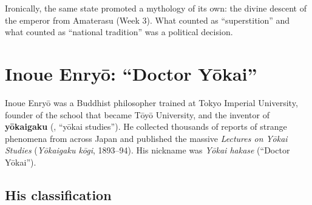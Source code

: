 \begin{remark}
Ironically, the same state promoted a mythology of its own: the divine descent of the
emperor from Amaterasu (Week 3). What counted as ``superstition'' and what counted as
``national tradition'' was a political decision.
\end{remark}

\section{Inoue Enryō: ``Doctor Yōkai''}

Inoue Enryō was a Buddhist philosopher trained at Tokyo Imperial University, founder of
the school that became Tōyō University, and the inventor of \textbf{yōkaigaku}
(, ``yōkai studies''). He collected thousands of reports of strange phenomena
from across Japan and published the massive \emph{Lectures on Yōkai Studies}
(\emph{Yōkaigaku kōgi}, 1893--94). His nickname was \emph{Yōkai hakase} (``Doctor Yōkai'').

\subsection{His classification}

\begin{center}
\end{center}

